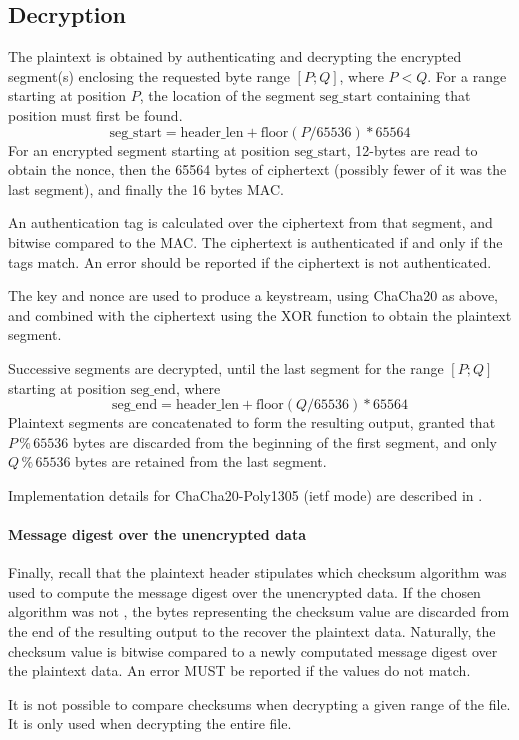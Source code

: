 \subsection{Decryption}
The plaintext is obtained by authenticating and decrypting the encrypted segment(s) enclosing the requested byte range $[P;Q]$, where $P<Q$.
%
For a range starting at position $P$, the location of the segment $\text{seg\_start}$ containing that position must first be found.
%
$$\text{seg\_start} = \text{header\_len} + \text{floor}(P/65536) * 65564$$
%
For an encrypted segment starting at position $\text{seg\_start}$, 12-bytes are read to obtain the nonce, then the 65564 bytes of ciphertext (possibly fewer of it was the last segment), and finally the 16 bytes MAC.

An authentication tag is calculated over the ciphertext from that segment, and bitwise compared to the MAC. The ciphertext is authenticated if and only if the tags match.
%
An error should be reported if the ciphertext is not authenticated.

The key and nonce are used to produce a keystream, using ChaCha20 as above, and combined with the ciphertext using the XOR function to obtain the plaintext segment.

Successive segments are decrypted, until the last segment for the range $[P;Q]$ starting at position $\text{seg\_end}$, where %
%
$$\text{seg\_end} = \text{header\_len} + \text{floor}(Q/65536) * 65564$$
%
Plaintext segments are concatenated to form the resulting output, granted that $P \mathbin{\%} 65536$ bytes are discarded from the beginning of the first segment, and only $Q \mathbin{\%} 65536$ bytes are retained from the last segment.

Implementation details for ChaCha20-Poly1305 (ietf mode) are described in \cite{RFC8439}.

\paragraph{Message digest over the unencrypted data}%
Finally, recall that the plaintext header stipulates which checksum algorithm was used to compute the message digest over the unencrypted data. If the chosen algorithm was not , the bytes representing the checksum value are discarded from the end of the resulting output to the recover the plaintext data.
% 
Naturally, the checksum value is bitwise compared to a newly computated message digest over the plaintext data. An error MUST be reported if the values do not match.

It is not possible to compare checksums when decrypting a given range of the file. It is only used when decrypting the entire file.

